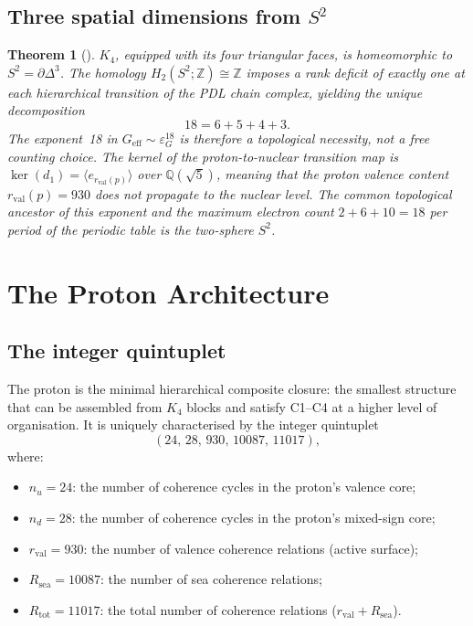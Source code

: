 \documentclass[11pt,a4paper]{article}
\theoremstyle{plain}
\newtheorem{theorem}{Theorem}[section]
\theoremstyle{definition}
\theoremstyle{remark}
\newcommand{\Kfour}{K_4}
\newcommand{\quintuplet}{(24,\,28,\,930,\,10087,\,11017)}
\newcommand{\Geff}{G_{\mathrm{eff}}}
\newcommand{\epsG}{\varepsilon_G}
\newcommand{\rval}{r_{\mathrm{val}}}
\newcommand{\Rtot}{R_{\mathrm{tot}}}
\begin{document}
\subsection{Three spatial dimensions from \texorpdfstring{$S^2$}{S2}}
\label{subsec:topology}

\begin{theorem}[\citep{D23}]
\label{thm:exponent18}
$\Kfour$, equipped with its four triangular faces, is homeomorphic to $S^2=\partial\Delta^3$.
The homology $H_2(S^2;\mathbb{Z})\cong\mathbb{Z}$ imposes a rank deficit of exactly one at each hierarchical transition of the PDL chain complex, yielding the unique decomposition
\[
18 = 6 + 5 + 4 + 3.
\]
The exponent~18 in $\Geff\sim\epsG^{18}$ is therefore a topological necessity, not a free counting choice.
The kernel of the proton-to-nuclear transition map is $\ker(d_1)=\langle e_{\rval(p)}\rangle$ over $\mathbb{Q}(\sqrt{5})$, meaning that the proton valence content $\rval(p)=930$ does not propagate to the nuclear level.
The common topological ancestor of this exponent and the maximum electron count $2+6+10=18$ per period of the periodic table is the two-sphere $S^2$.
\end{theorem}

\section{The Proton Architecture}
\label{sec:proton}

\subsection{The integer quintuplet}
\label{subsec:quintuplet}

The proton is the minimal hierarchical composite closure: the smallest structure that can be assembled from $\Kfour$ blocks and satisfy C1--C4 at a higher level of organisation.
It is uniquely characterised by the integer quintuplet
\[
\quintuplet,
\]
where:
\begin{itemize}
\item $n_u = 24$: the number of coherence cycles in the proton's valence core;
\item $n_d = 28$: the number of coherence cycles in the proton's mixed-sign core;
\item $\rval = 930$: the number of valence coherence relations (active surface);
\item $R_{\mathrm{sea}} = 10087$: the number of sea coherence relations;
\item $\Rtot = 11017$: the total number of coherence relations ($\rval + R_{\mathrm{sea}}$).
\end{itemize}
\end{document}
